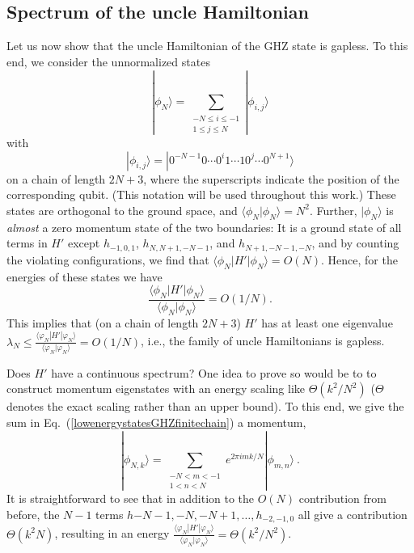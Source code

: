 \documentclass[cmp]{svjour}
\newcommand{\bra}[1]{\langle #1|}
\newcommand{\ket}[1]{|#1\rangle}
\newcommand{\braket}[2]{\langle #1|#2\rangle}
\begin{document}
\subsection{Spectrum of the uncle Hamiltonian}
Let us now show that the uncle Hamiltonian of the GHZ state is gapless.
To this end, we consider the unnormalized states
\begin{equation}\label{lowenergystatesGHZfinitechain}
    \ket{\phi_{N}}=\sum_{\substack{-N \le i \le -1\\1 \le j \le N}}
    \ket{\phi_{i,j}}
\end{equation}
with
\[
    \ket{\phi_{i,j}}=\ket{0^{-N-1}0\cdots 0^i1\cdots 10^j\cdots 0^{N+1}}
\]
on a chain of length $2N+3$, where the superscripts indicate the position
of the corresponding qubit.  (This notation will be used throughout this
work.) These states are orthogonal to the ground space,  and
$\braket{\phi_N}{\phi_N}=N^2$.  Further, $\ket{\phi_N}$ is \emph{almost} a
zero momentum state of the two boundaries: It is a ground state of all
terms in $H'$ except $h_{-1,0,1}$, $h_{N,N+1,-N-1}$, and
$h_{N+1,-N-1,-N}$, and by counting the violating configurations, we find
that $\bra{\phi_N}H' \ket{\phi_N}=O(N)$.  Hence, for the energies of these
states we have
\begin{equation}
    \frac{\bra{\phi_N}H' \ket{\phi_N}}{\braket{\phi_N}{\phi_N}}=O(1/N).
\end{equation}
This implies that (on a chain of length $2N+3$)
$H'$ has at least one eigenvalue $\lambda_N\le
    \frac{\bra{\varphi_N}H' \ket{\varphi_N}}{\braket{\varphi_N}{\varphi_N}}=
    O(1/N)$, i.e., the  family  of uncle Hamiltonians is gapless.

Does $H'$ have a continuous spectrum? One idea to prove so would be to to
construct momentum eigenstates with an energy scaling like
$\Theta(k^2/N^2)$ ($\Theta$ denotes the exact scaling rather than an upper
bound).  To this end, we give the sum in
Eq.~(\ref{lowenergystatesGHZfinitechain}) a momentum,
\begin{equation}\label{eq:GHZ-momentumstates}
    \ket{\phi_{N,k}}=\sum_{\substack{-N< m<-1\\1< n < N}}
    e^{2\pi i m k/N}\ket{\phi_{m,n}}\ .
\end{equation}
It is straightforward to see that in addition to the $O(N)$ contribution from
before, the $N-1$ terms $h{-N-1,-N,-N+1},\dots,h_{-2,-1,0}$ all give a
contribution $\Theta(k^2N)$, resulting in an energy
$\frac{\bra{\varphi_N}H' \ket{\varphi_N}}{\braket{\varphi_N}{\varphi_N}}=
    \Theta(k^2/N^2)$.
\end{document}
